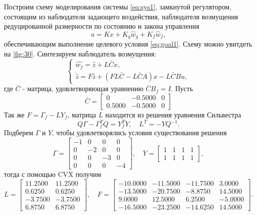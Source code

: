 Построим схему моделирования системы \eqref{eq:sys1}, замкнутой регулятором,
состоящим из наблюдателя задающего воздействия, наблюдателя возмущения редуцированной
размерности по состоянию и закона управления
\begin{equation}
    \label{eq:reg3}
    u=Kx+K_g\hat w_g+K_f\hat w_f,
\end{equation}
обеспечивающим выполнение целевого условия \eqref{eq:goal1}. Схему можно
увитдеть на \autoref{fig:30}.
Синтезируем наблюдатель возмущения:
\begin{equation*}
    \begin{cases}
        \hat{w_f}=\hat z+L\bar Cx,\\
        \dot{\hat z}=F\hat z+(FL\bar C-L\bar CA)x-L\bar CBu,
    \end{cases}
\end{equation*}
где $\bar C$ - матрица, удовлетворяющая уравнению $\bar CB_f=I$.
Пусть
\begin{equation*}
    \bar C=\begin{bmatrix}
        0	&-0.5000&	0\\
        0.5000	&-0.5000	&0
    \end{bmatrix}
\end{equation*}
Так же $F=\Gamma_f-LY_f$, матрица $L$ находится из решения уравнения Сильвестра
\begin{equation*}
    Q\Gamma-\Gamma_f^TQ=Y_f^TY,\quad L^T=-YQ^{-1}.
\end{equation*}
Подберем $\Gamma$ и $Y$, чтобы удовлетворялись условия существования решения
\begin{equation*}
    \Gamma=\begin{bmatrix}
        -1 & 0 & 0 & 0 \\
        0 & -2 & 0 & 0\\
        0 & 0 & -3 & 0\\
        0 & 0& 0& -4
    \end{bmatrix},\quad
    Y=\begin{bmatrix}
        1&1 & 1&1 \\ 1&1& 1&1
    \end{bmatrix},
\end{equation*}
тогда с помощью CVX получим
\begin{equation*}
    L=\begin{bmatrix}
        11.2500	&11.2500\\
        0.6250	&0.6250\\
        -3.7500	&-3.7500\\
        6.8750	&6.8750
    \end{bmatrix},\quad
    F=\begin{bmatrix}
        -10.0000	&-11.5000	&-11.7500&	3.0000\\
        -13.5000	&-20.7500	&-8.8750&	14.5000\\
        9.0000&	12.5000&	6.2500	&-5.0000\\
        -16.5000	&-23.2500	&-14.6250&	14.5000
    \end{bmatrix}.
\end{equation*}

